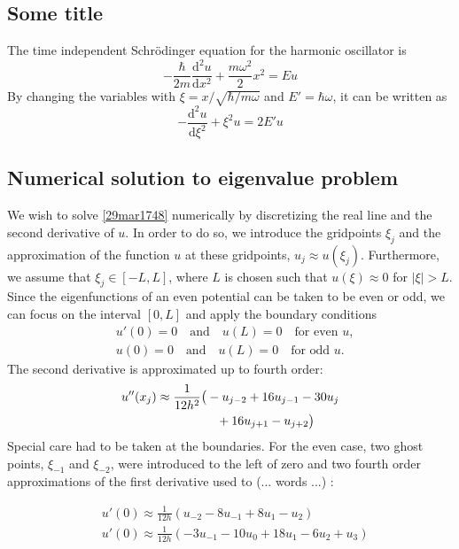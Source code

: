 \documentclass[twocolumn]{article}
\begin{document}
\begin{large}
\section*{Some title}
The time independent Schrödinger equation for the harmonic oscillator is 
\begin{equation}
    -\frac{\hbar}{2m}\frac{\text{d}^2u}{\text{d}x^2} + \frac{m\omega^2}{2}x^2 = Eu
\end{equation}
By changing the variables with $\xi = x/\sqrt{\hbar/m\omega}$ and $E' = \hbar\omega$, it can be written as 
\begin{equation}
    \label{29mar1748}
    -\frac{\text{d}^2u}{\text{d}\xi^2} + \xi^2u = 2E'u
\end{equation}

\subsection*{Numerical solution to eigenvalue problem}
We wish to solve \eqref{29mar1748} numerically by discretizing the real line and the second derivative of $u$. In order to do so, we introduce the gridpoints $\xi_j$ and the approximation of the function $u$ at these gridpoints, $u_j\approx u(\xi_j)$. Furthermore, we assume that $\xi_j\in[-L,L]$, where $L$ is chosen such that $u(\xi)\approx 0$ for $|\xi|>L$. Since the eigenfunctions of an even potential can be taken to be even or odd, we can focus on the interval $[0,L]$ and apply the boundary conditions 
\begin{equation}
    \begin{split}
        &u'(0) = 0 \quad\text{and}\quad u(L) = 0 \quad \text{for even } u, \\ 
        &u(0) = 0 \quad\text{and}\quad u(L) = 0 \quad \text{for odd } u.
    \end{split}
\end{equation} 
The second derivative is approximated up to fourth order:
\begin{equation}
    \begin{split}
        u''(x_j) &\approx \frac{1}{12h^2}\big(-u_{j-2}+16u_{j-1}-30u_j \\ 
        &\hspace{1.7cm}+16u_{j+1}-u_{j+2}\big) 
    \end{split}
\end{equation}
Special care had to be taken at the boundaries. For the even case, two ghost points, $\xi_{-1}$ and $\xi_{-2}$, were introduced to the left of zero and two fourth order approximations of the first derivative used to  (... words ...) :

\begin{equation}
    \begin{split}
        &u'(0) \approx \frac{1}{12h}\left(u_{-2}-8u_{-1}+8u_1-u_2\right) \\ 
        &u'(0) \approx \frac{1}{12h}\left(-3u_{-1}-10u_0+18u_1-6u_2+u_3\right)
    \end{split}
\end{equation}



\end{large}
\end{document}
